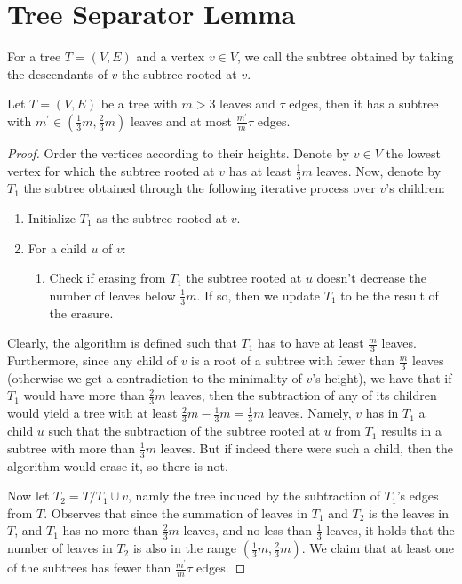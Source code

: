 
  \section{Tree Separator Lemma}
 For a tree $T = (V, E)$ and a vertex $v \in V$, we call the subtree obtained by taking the descendants of $v$ the subtree rooted at $v$.


  \begin{claim}
    \label{claim:tree_separator}
    Let $T = (V,E)$ be a tree with $m > 3$ leaves and $\tau$ edges, then it has a subtree with $m^{\prime} \in ( \frac{1}{3}m, \frac{2}{3}m)$ leaves and at most $ \frac{m^{\prime}}{m} \tau$ edges. 
  \end{claim}
  \begin{proof}
Order the vertices according to their heights. Denote by $v \in V$ the lowest vertex for which the subtree rooted at $v$ has at least $\frac{1}{3}m$ leaves. Now, denote by $T_{1}$ the subtree obtained through the following iterative process over $v$'s children:
\begin{enumerate}
  \item Initialize $T_{1}$ as the subtree rooted at $v$.
  \item For a child $u$ of $v$:
    \begin{enumerate}
      \item Check if erasing from $T_{1}$ the subtree rooted at $u$ doesn't decrease the number of leaves below $\frac{1}{3}m$. If so, then we update $T_{1}$ to be the result of the erasure.
    \end{enumerate}
\end{enumerate}
Clearly, the algorithm is defined such that $ T_{1} $ has to have at least $\frac{m}{3}$ leaves. Furthermore, since any child of $ v $ is a root of a subtree with fewer than $\frac{m}{3}$ leaves (otherwise we get a contradiction to the minimality of $ v $'s height), we have that if $ T_{1} $ would have more than $\frac{2}{3}m$ leaves, then the subtraction of any of its children would yield a tree with at least $\frac{2}{3}m - \frac{1}{3}m = \frac{1}{3}m$ leaves. Namely, $ v $ has in $ T_{1} $ a child $ u $ such that the subtraction of the subtree rooted at $ u $ from $ T_{1} $ results in a subtree with more than $\frac{1}{3}m$ leaves. But if indeed there were such a child, then the algorithm would erase it, so there is not. 


Now let $T_{2} = T/T_{1} \cup {v}$, namly the tree induced by the subtraction of $T_{1}$'s edges from $T$. Observes that since the summation of leaves in $T_{1}$ and $T_{2}$ is the leaves in $T$, and $T_{1}$ has no more than $\frac{2}{3}m$ leaves, and no less than $\frac{1}{3}$ leaves, it holds that the number of leaves in $T_{2}$ is also in the range $(\frac{1}{3}m, \frac{2}{3}m)$. We claim that at least one of the  subtrees has fewer than $\frac{m^{\prime}}{m} \tau$ edges. 


\end{proof}
